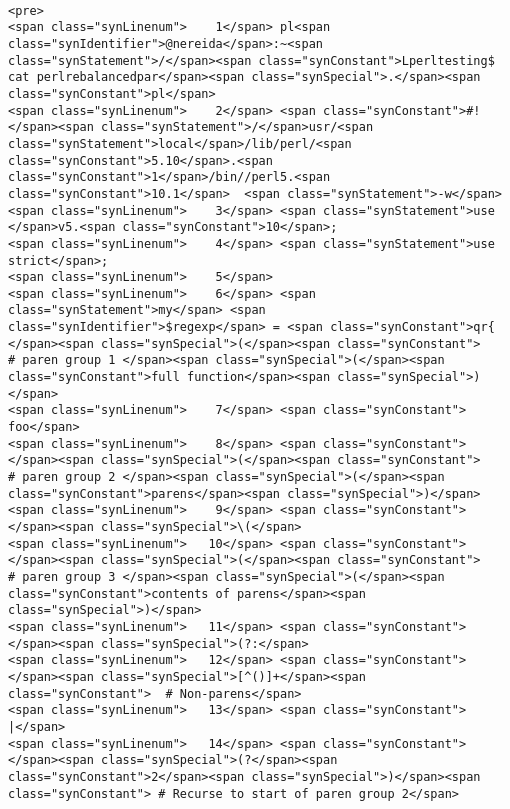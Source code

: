 \begin{verbatim}

<pre>
<span class="synLinenum">    1</span> pl<span class="synIdentifier">@nereida</span>:~<span class="synStatement">/</span><span class="synConstant">Lperltesting$ cat perlrebalancedpar</span><span class="synSpecial">.</span><span class="synConstant">pl</span>
<span class="synLinenum">    2</span> <span class="synConstant">#!</span><span class="synStatement">/</span>usr/<span class="synStatement">local</span>/lib/perl/<span class="synConstant">5.10</span>.<span class="synConstant">1</span>/bin//perl5.<span class="synConstant">10.1</span>  <span class="synStatement">-w</span>
<span class="synLinenum">    3</span> <span class="synStatement">use </span>v5.<span class="synConstant">10</span>;
<span class="synLinenum">    4</span> <span class="synStatement">use strict</span>;
<span class="synLinenum">    5</span> 
<span class="synLinenum">    6</span> <span class="synStatement">my</span> <span class="synIdentifier">$regexp</span> = <span class="synConstant">qr{ </span><span class="synSpecial">(</span><span class="synConstant">                      # paren group 1 </span><span class="synSpecial">(</span><span class="synConstant">full function</span><span class="synSpecial">)</span>
<span class="synLinenum">    7</span> <span class="synConstant">                foo</span>
<span class="synLinenum">    8</span> <span class="synConstant">                   </span><span class="synSpecial">(</span><span class="synConstant">                    # paren group 2 </span><span class="synSpecial">(</span><span class="synConstant">parens</span><span class="synSpecial">)</span>
<span class="synLinenum">    9</span> <span class="synConstant">                     </span><span class="synSpecial">\(</span>
<span class="synLinenum">   10</span> <span class="synConstant">                        </span><span class="synSpecial">(</span><span class="synConstant">               # paren group 3 </span><span class="synSpecial">(</span><span class="synConstant">contents of parens</span><span class="synSpecial">)</span>
<span class="synLinenum">   11</span> <span class="synConstant">                           </span><span class="synSpecial">(?:</span>
<span class="synLinenum">   12</span> <span class="synConstant">                                </span><span class="synSpecial">[^()]+</span><span class="synConstant">  # Non-parens</span>
<span class="synLinenum">   13</span> <span class="synConstant">                              |</span>
<span class="synLinenum">   14</span> <span class="synConstant">                                </span><span class="synSpecial">(?</span><span class="synConstant">2</span><span class="synSpecial">)</span><span class="synConstant"> # Recurse to start of paren group 2</span>

\end{verbatim}

